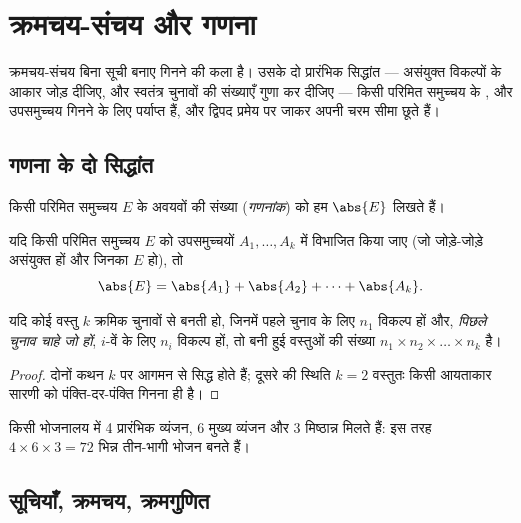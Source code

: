 \chapter{क्रमचय-संचय और गणना}\label{ch:g12:comb}

क्रमचय-संचय बिना सूची बनाए गिनने की कला है। उसके दो प्रारंभिक सिद्धांत ---
असंयुक्त विकल्पों के आकार जोड़ दीजिए, और स्वतंत्र चुनावों की संख्याएँ गुणा कर
दीजिए --- किसी परिमित समुच्चय के ,  और उपसमुच्चय गिनने के लिए
पर्याप्त हैं, और द्विपद प्रमेय पर जाकर अपनी चरम सीमा छूते हैं।

\section{गणना के दो सिद्धांत}

किसी परिमित समुच्चय $E$ के अवयवों की संख्या (\emph{गणनांक}) को हम $\abs{E}$ लिखते
हैं।

\begin{proposition}[योग का सिद्धांत]\label{prop:g12:comb:addition}
यदि किसी परिमित समुच्चय $E$ को उपसमुच्चयों $A_1, \dots, A_k$ में विभाजित किया जाए (जो
जोड़े-जोड़े असंयुक्त हों और जिनका  $E$ हो), तो
\[
\abs{E} = \abs{A_1} + \abs{A_2} + \dots + \abs{A_k}.
\]
\end{proposition}

\begin{proposition}[गुणन का सिद्धांत]\label{prop:g12:comb:multiplication}
यदि कोई वस्तु $k$ क्रमिक चुनावों से बनती हो, जिनमें पहले चुनाव के लिए $n_1$
विकल्प हों और, \emph{पिछले चुनाव चाहे जो हों}, $i$-वें के लिए $n_i$ विकल्प
हों, तो बनी हुई वस्तुओं की संख्या $n_1 \times n_2 \times \dots \times n_k$ है।
\end{proposition}

\begin{proof}
दोनों कथन $k$ पर आगमन से सिद्ध होते हैं; दूसरे की स्थिति $k = 2$ वस्तुतः किसी
आयताकार सारणी को पंक्ति-दर-पंक्ति गिनना ही है।
\end{proof}

\begin{example}
किसी भोजनालय में 4 प्रारंभिक व्यंजन, 6 मुख्य व्यंजन और 3 मिष्ठान्न मिलते हैं:
इस तरह $4 \times 6 \times 3 =
72$ भिन्न तीन-भागी भोजन बनते हैं।
\end{example}

\section{सूचियाँ, क्रमचय, क्रमगुणित}

